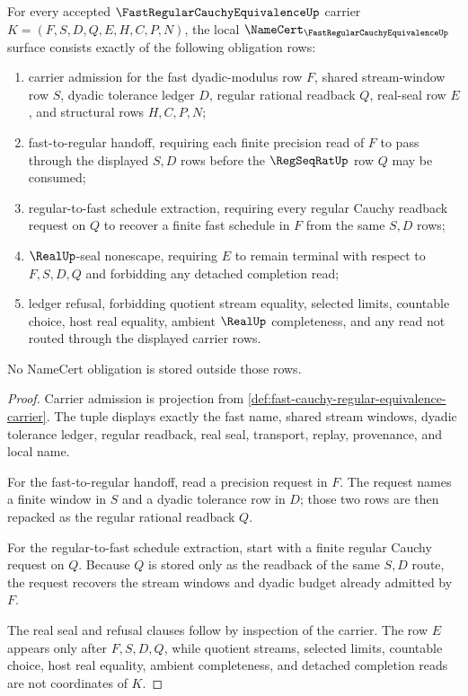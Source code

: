 \begin{theorem}
\label{thm:fast-cauchy-regular-equivalence-namecert-obligations}
For every accepted $\FastRegularCauchyEquivalenceUp$ carrier $K=(F,S,D,Q,E,H,C,P,N)$, the local $\NameCert_{\FastRegularCauchyEquivalenceUp}$ surface consists exactly of the following obligation rows:
\begin{enumerate}
\item carrier admission for the fast dyadic-modulus row $F$, shared stream-window row $S$, dyadic tolerance ledger $D$, regular rational readback $Q$, real-seal row $E$, and structural rows $H,C,P,N$;
\item fast-to-regular handoff, requiring each finite precision read of $F$ to pass through the displayed $S,D$ rows before the $\RegSeqRatUp$ row $Q$ may be consumed;
\item regular-to-fast schedule extraction, requiring every regular Cauchy readback request on $Q$ to recover a finite fast schedule in $F$ from the same $S,D$ rows;
\item $\RealUp$-seal nonescape, requiring $E$ to remain terminal with respect to $F,S,D,Q$ and forbidding any detached completion read;
\item ledger refusal, forbidding quotient stream equality, selected limits, countable choice, host real equality, ambient $\RealUp$ completeness, and any read not routed through the displayed carrier rows.
\end{enumerate}
No NameCert obligation is stored outside those rows.
\end{theorem}
\begin{proof}
Carrier admission is projection from \autoref{def:fast-cauchy-regular-equivalence-carrier}. The tuple displays exactly the fast name, shared stream windows, dyadic tolerance ledger, regular readback, real seal, transport, replay, provenance, and local name.

For the fast-to-regular handoff, read a precision request in $F$. The request names a finite window in $S$ and a dyadic tolerance row in $D$; those two rows are then repacked as the regular rational readback $Q$.

For the regular-to-fast schedule extraction, start with a finite regular Cauchy request on $Q$. Because $Q$ is stored only as the readback of the same $S,D$ route, the request recovers the stream windows and dyadic budget already admitted by $F$.

The real seal and refusal clauses follow by inspection of the carrier. The row $E$ appears only after $F,S,D,Q$, while quotient streams, selected limits, countable choice, host real equality, ambient completeness, and detached completion reads are not coordinates of $K$.
\end{proof}

